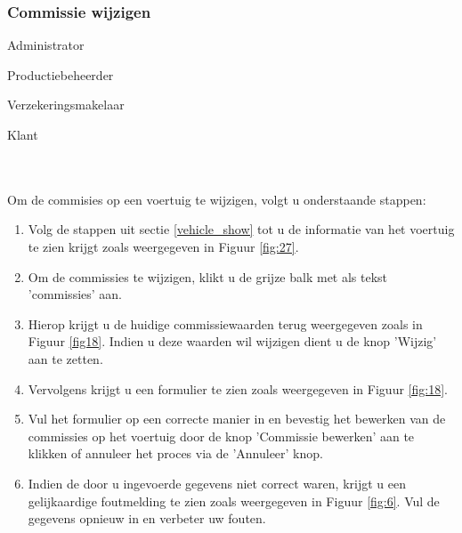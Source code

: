 \documentclass[11pt,openany]{article}
\newcommand{\cmark}{\ding{51}}%
\newcommand{\xmark}{\ding{55}}%
\newcommand{\done}{\rlap{$\square$}{\raisebox{2pt}{\large\hspace{1pt}\cmark}}%
	\hspace{-2.5pt}}
\newcommand{\wontfix}{\rlap{$\square$}{\large\hspace{1pt}\xmark}}
\begin{document}
\subsubsection{Commissie wijzigen}
\begin{todolist}
	\item[\done] Administrator
	\item[\done] Productiebeheerder
	\item[\done] Verzekeringsmakelaar
	\item[\wontfix] Klant 
\end{todolist}
\\
\\
Om de commisies op een voertuig te wijzigen, volgt u onderstaande stappen:
\begin{enumerate}
	\item Volg de stappen uit sectie \ref{vehicle_show} tot u de informatie van het voertuig te zien krijgt zoals weergegeven in Figuur \ref{fig:27}. 
	\item Om de commissies te wijzigen, klikt u de grijze balk met als tekst 'commissies' aan.
	\item Hierop krijgt u de huidige commissiewaarden terug weergegeven zoals in Figuur \ref{fig18}. Indien u deze waarden wil wijzigen dient u de knop 'Wijzig' aan te zetten.
	\item Vervolgens krijgt u een formulier te zien zoals weergegeven in Figuur \ref{fig:18}.
	\item Vul het formulier op een correcte manier in en bevestig het bewerken van de commissies op het voertuig door de knop 'Commissie bewerken' aan te klikken of annuleer het proces via de 'Annuleer' knop.
	\item Indien de door u ingevoerde gegevens niet correct waren, krijgt u een gelijkaardige foutmelding te zien zoals weergegeven in Figuur \ref{fig:6}. Vul de gegevens opnieuw in en verbeter uw fouten.
\end{enumerate}


\

\label{vehicle_commision}
\end{document}
